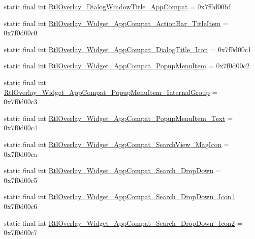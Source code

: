 \begin{DoxyCompactItemize}
\item 
static final int \mbox{\hyperlink{classandroid_1_1support_1_1design_1_1R_1_1style_abb7a1569de346ab246bb77f817bd1ce9}{Rtl\+Overlay\+\_\+\+Dialog\+Window\+Title\+\_\+\+App\+Compat}} = 0x7f0d00bf
\item 
static final int \mbox{\hyperlink{classandroid_1_1support_1_1design_1_1R_1_1style_ae25aaafa59260a6b79ec287a3beb1a39}{Rtl\+Overlay\+\_\+\+Widget\+\_\+\+App\+Compat\+\_\+\+Action\+Bar\+\_\+\+Title\+Item}} = 0x7f0d00c0
\item 
static final int \mbox{\hyperlink{classandroid_1_1support_1_1design_1_1R_1_1style_a0246a2939405f0f3a9d2297f3a9af4af}{Rtl\+Overlay\+\_\+\+Widget\+\_\+\+App\+Compat\+\_\+\+Dialog\+Title\+\_\+\+Icon}} = 0x7f0d00c1
\item 
static final int \mbox{\hyperlink{classandroid_1_1support_1_1design_1_1R_1_1style_aa3c7b42ba6b7b9c67911c84bc40539c0}{Rtl\+Overlay\+\_\+\+Widget\+\_\+\+App\+Compat\+\_\+\+Popup\+Menu\+Item}} = 0x7f0d00c2
\item 
static final int \mbox{\hyperlink{classandroid_1_1support_1_1design_1_1R_1_1style_ad71265267679035bf7edd1e400e3dd35}{Rtl\+Overlay\+\_\+\+Widget\+\_\+\+App\+Compat\+\_\+\+Popup\+Menu\+Item\+\_\+\+Internal\+Group}} = 0x7f0d00c3
\item 
static final int \mbox{\hyperlink{classandroid_1_1support_1_1design_1_1R_1_1style_ad1d99892921697cf4b200f1460ef494b}{Rtl\+Overlay\+\_\+\+Widget\+\_\+\+App\+Compat\+\_\+\+Popup\+Menu\+Item\+\_\+\+Text}} = 0x7f0d00c4
\item 
static final int \mbox{\hyperlink{classandroid_1_1support_1_1design_1_1R_1_1style_ab4feb2c6d3b2235377bd63bfd6ccdbae}{Rtl\+Overlay\+\_\+\+Widget\+\_\+\+App\+Compat\+\_\+\+Search\+View\+\_\+\+Mag\+Icon}} = 0x7f0d00ca
\item 
static final int \mbox{\hyperlink{classandroid_1_1support_1_1design_1_1R_1_1style_ad641028a3298caa7cb319dba54de145d}{Rtl\+Overlay\+\_\+\+Widget\+\_\+\+App\+Compat\+\_\+\+Search\+\_\+\+Drop\+Down}} = 0x7f0d00c5
\item 
static final int \mbox{\hyperlink{classandroid_1_1support_1_1design_1_1R_1_1style_ade60ca91c16982eaf6b75694ed4f86c2}{Rtl\+Overlay\+\_\+\+Widget\+\_\+\+App\+Compat\+\_\+\+Search\+\_\+\+Drop\+Down\+\_\+\+Icon1}} = 0x7f0d00c6
\item 
static final int \mbox{\hyperlink{classandroid_1_1support_1_1design_1_1R_1_1style_a33f59a8fbfa51417eb810c8f3ea703d3}{Rtl\+Overlay\+\_\+\+Widget\+\_\+\+App\+Compat\+\_\+\+Search\+\_\+\+Drop\+Down\+\_\+\+Icon2}} = 0x7f0d00c7

\end{DoxyCompactItemize}
